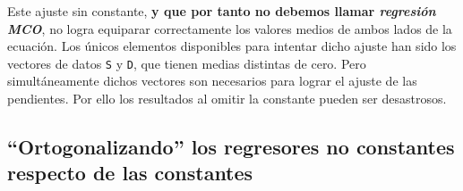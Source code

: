 \documentclass[11pt]{article}
\begin{document}
\begin{itemize}
\begin{itemize}
Este ajuste sin constante, \textbf{y que por tanto no debemos llamar
\emph{regresión MCO}}, no logra equiparar correctamente los valores
medios de ambos lados de la ecuación. Los únicos elementos
disponibles para intentar dicho ajuste han sido los vectores de
datos \texttt{S} y \texttt{D}, que tienen medias distintas de cero. Pero
simultáneamente dichos vectores son necesarios para lograr el
ajuste de las pendientes. Por ello los resultados al omitir la
constante pueden ser desastrosos.
\end{itemize}
\end{itemize}

\subsection{``Ortogonalizando'' los regresores no constantes respecto de las constantes}
\label{sec:orgf0ecda3}
\end{document}
